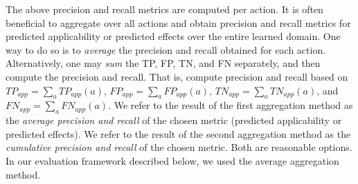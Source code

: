 \documentclass{article}
\theoremstyle{definition}
\theoremstyle{remark}
\newcommand{\app}{\ensuremath{\textit{app}}\xspace}
\newif\ifaddcomments
\newcommand{\roni}[1]{\ifaddcomments{\textcolor{red}{[Roni: #1]}}\fi}
\newcommand{\leo}[1]{\ifaddcomments{\textcolor{pink}{[Leonardo: #1]}}\fi}
\begin{document}
The above precision and recall metrics are computed per action. It is often beneficial to aggregate over all actions and obtain precision and recall metrics for predicted applicability or predicted effects over the entire learned domain. 
One way to do so is to \emph{average} the precision and recall obtained for each action. 
Alternatively, one may \emph{sum} the 
TP, FP, TN, and FN separately, and then compute the precision and recall. 
That is, compute precision and recall based on $TP_\app=\sum_a TP_\app(a)$, 
$FP_\app=\sum_a FP_\app(a)$,
$TN_\app=\sum_a TN_\app(a)$, and
$FN_\app=\sum_a FN_\app(a)$. 
We refer to the result of the first aggregation method as the \emph{average precision and recall} of the chosen metric (predicted applicability or predicted effects). 
We refer to the result of the second aggregation method as the \emph{cumulative precision and recall} of the chosen metric.  
Both are reasonable options. 
In our evaluation framework described below, we used the average aggregation method. 
\leo{For syntactic precision the `simple` one, this is because e.g. if there are 2 actions with 1 and 10 precs/effs resp., then the precision averaged over the two actions weights 1 mistake in the first action differently from 1 mistake in the second one, I am not sure we want this. For the predictive power metrics we aggregated using the `equal-action` method, this is because the number of samples can be very unbalanced (e.g. 1 vs 100). I do not think there is a `right` one, so I stored both metrics during the experiments and we can choose}
\roni{In the syntactic metrics this is not an issue because we measure based on the model, not the states in the test set. }



\end{document}
